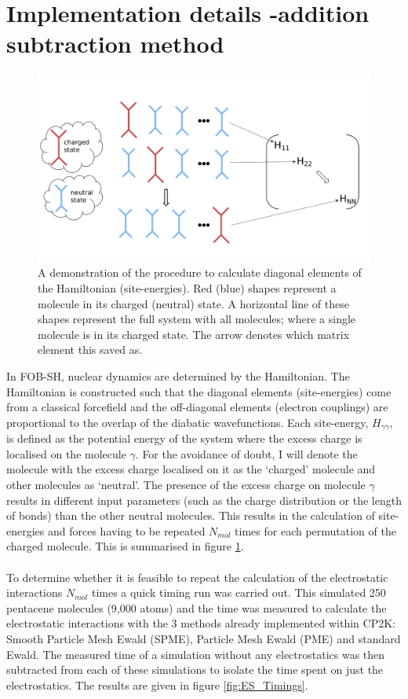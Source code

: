 \section{Implementation details -addition subtraction method}
\label{sect:addSubMethod}
\begin{figure}[ht]
  \includegraphics[width=\textwidth]{./img/ES/ForceEnerCalc.png}
  \caption{\label{fig:FE_Calc}A demonstration of the procedure to calculate diagonal elements of the Hamiltonian (site-energies). Red (blue) shapes represent a molecule in its charged (neutral) state. A  horizontal line of these shapes represent the full system with all molecules; where a single molecule is in its charged state. The arrow denotes which matrix element this saved as.}
\end{figure}
\noindent In FOB-SH, nuclear dynamics are determined by the Hamiltonian. The Hamiltonian is constructed such that the diagonal elements (site-energies) come from a classical forcefield and the off-diagonal elements (electron couplings) are proportional to the overlap of the diabatic wavefunctions. Each site-energy, $H_{\gamma \gamma}$, is defined as the potential energy of the system where the excess charge is localised on the molecule $\gamma$. For the avoidance of doubt, I will denote the molecule with the excess charge localised on it as the `charged' molecule and other molecules as `neutral'. The presence of the excess charge on molecule $\gamma$ results in different input parameters (such as the charge distribution or the length of bonds) than the other neutral molecules. This results in the calculation of site-energies and forces having to be repeated $N_{mol}$ times for each permutation of the charged molecule. This is summarised in figure \ref{fig:FE_Calc}. 
\\\\
To determine whether it is feasible to repeat the calculation of the electrostatic interactions $N_{mol}$ times a quick timing run was carried out. This simulated 250 pentacene molecules (9,000 atoms) and the time was measured to calculate the electrostatic interactions with the 3 methods already implemented within CP2K: Smooth Particle Mesh Ewald (SPME), Particle Mesh Ewald (PME) and standard Ewald. The measured time of a simulation without any electrostatics was then subtracted from each of these simulations to isolate the time spent on just the electrostatics. The results are given in figure  \ref{fig:ES_Timings}.
